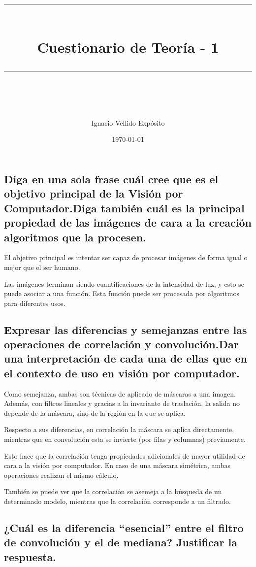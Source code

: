 \documentclass[11pt]{scrartcl} %
\title{	
	\normalfont\normalsize	
	\rule{\linewidth}{0.5pt}\\ %
	\vspace{20pt} %
	{\huge Cuestionario de Teoría - 1}\\ %
	\vspace{12pt} %
	\rule{\linewidth}{2pt}\\ %
	\vspace{12pt} %
}
\author{\LARGE Ignacio Vellido Expósito} %
\date{\normalsize\today} %
\begin{document}
\maketitle %

\subsection{Diga en una sola frase cuál cree que es el objetivo principal de la 
Visión por Computador.\newline Diga también cuál es la principal propiedad de las 
imágenes de cara a la creación algoritmos que la procesen.}

El objetivo principal es intentar ser capaz de procesar imágenes de forma igual
o mejor que el ser humano.\newline

Las imágenes terminan siendo cuantificaciones de la intensidad de luz, y esto se
puede asociar a una función. Esta función puede ser procesada por algoritmos
para diferentes usos.

\subsection{Expresar las diferencias y semejanzas entre las operaciones de 
correlación y convolución.\newline Dar una interpretación de cada una de ellas que en 
el contexto de uso en visión por computador.}

Como semejanza, ambas son técnicas de aplicado de máscaras a una imagen.
Además, con filtros lineales y gracias a la invariante de traslación, la salida 
no depende de la máscara, sino de la región en la que se aplica.\newline
	 
Respecto a sus diferencias, en correlación la máscara se aplica directamente, 
mientras que en convolución esta se invierte (por filas y columnas) previamente.

Esto hace que la correlación tenga propiedades adicionales de mayor utilidad de
cara a la visión por computador.
En caso de una máscara simétrica, ambas operaciones realizan el mismo cálculo.\newline

También se puede ver que la correlación se asemeja a la búsqueda de un determinado
modelo, mientras que la correlación corresponde a un filtrado.

\newpage

\subsection{¿Cuál es la diferencia “esencial” entre el filtro de convolución y 
el de mediana? Justificar la respuesta.}
\end{document}
